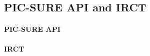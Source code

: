 

\subsection{PIC-SURE API and IRCT}
\label{sec:bg-picsure}



\paragraph{PIC-SURE API}



\paragraph{IRCT}



